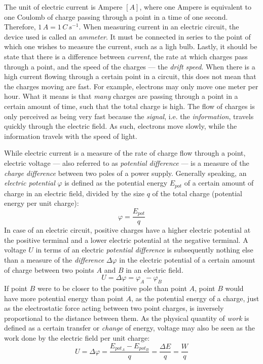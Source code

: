 The unit of electric current is Ampere $[A]$, where one Ampere is equivalent to one Coulomb of charge passing through a point in a time of one second. Therefore, $1\, A = 1\, C\, s^{-1}$. When measuring current in an electric circuit, the device used is called an \emph{ammeter}. It must be connected in series to the point of which one wishes to measure the current, such as a ligh bulb. Lastly, it should be state that there is a difference between \emph{current}, the rate at which charges pass through a point, and the speed of the charges --- the \emph{drift speed}. When there is a high current flowing through a certain point in a circuit, this does not mean that the charges moving are fast. For example, electrons may only move one meter per hour. What it means is that \emph{many} charges are passing through a point in a certain amount of time, such that the total charge is high. The flow of charges is only perceived as being very fast because the \emph{signal}, i.e. the \emph{information}, travels quickly through the electric field. As such, electrons move slowly, while the information travels with the speed of light.


While electric current is a measure of the rate of charge flow through a point, electric voltage --- also referred to as \emph{potential difference} --- is a measure of the \emph{charge difference} between two poles of a power supply. Generally speaking, an \emph{electric potential} $\varphi$ is defined as the potential energy $E_{pot}$ of a certain amount of charge in an electric field, divided by the size $q$ of the total charge (potential energy per unit charge): $$\varphi = \frac{E_{pot}}{q}$$ In case of an electric circuit, positive charges have a higher electric potential at the positive terminal and a lower electric potential at the negative terminal. A voltage $U$ in terms of an electric \emph{potential difference} is subsequently nothing else than a measure of the \emph{difference} $\Delta \varphi$ in the electric potential of a certain amount of charge between two points $A$ and $B$ in an electric field. $$U = \Delta \varphi = \varphi_A - \varphi_B$$ If point $B$ were to be closer to the positive pole than point $A$, point $B$ would have more potential energy than point $A$, as the potential energy of a charge, just as the electrostatic force acting between two point charges, is inversely proportional to the distance between them. As the physical quantity of \emph{work} is defined as a certain transfer or \emph{change} of energy, voltage may also be seen as the work done by the electric field per unit charge: $$U = \Delta \varphi = \frac{E_{pot_A} - E_{pot_B}}{q} = \frac{\Delta E}{q} = \frac{W}{q}$$


